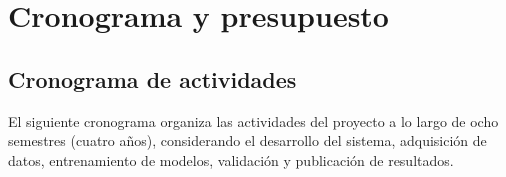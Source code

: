 
\chapter{Cronograma y presupuesto}

\label{Chapter4}

\section{Cronograma de actividades}

El siguiente cronograma organiza las actividades del proyecto a lo largo de ocho semestres (cuatro años), considerando el desarrollo del sistema, adquisición de datos, entrenamiento de modelos, validación y publicación de resultados.\\

